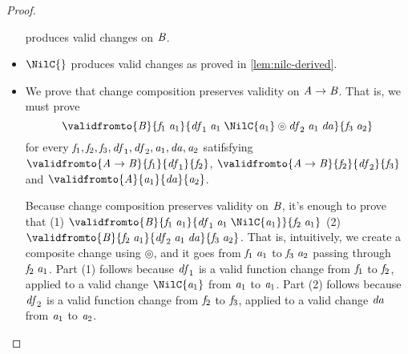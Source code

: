 \begin{proof}
\begin{itemize}
    produces valid changes on \ensuremath{\Conid{B}}.
  \item \ensuremath{\NilC{}} produces valid changes as proved in \cref{lem:nilc-derived}.
  \item We prove that change composition preserves validity on \ensuremath{\Conid{A}\to \Conid{B}}. That
    is, we must prove \[\ensuremath{\validfromto{\Conid{B}}{\Varid{f}_{1}\;\Varid{a}_{1}}{\Varid{df}_{1}\;\Varid{a}_{1}\;\NilC{\Varid{a}_{1}}\circledcirc\Varid{df}_{2}\;\Varid{a}_{1}\;\Varid{da}}{\Varid{f}_{3}\;\Varid{a}_{2}}}\] for every \ensuremath{\Varid{f}_{1},\Varid{f}_{2},\Varid{f}_{3},\Varid{df}_{1},\Varid{df}_{2},\Varid{a}_{1},\Varid{da},\Varid{a}_{2}} satifsfying
    \ensuremath{\validfromto{\Conid{A}\to \Conid{B}}{\Varid{f}_{1}}{\Varid{df}_{1}}{\Varid{f}_{2}}}, \ensuremath{\validfromto{\Conid{A}\to \Conid{B}}{\Varid{f}_{2}}{\Varid{df}_{2}}{\Varid{f}_{3}}} and \ensuremath{\validfromto{\Conid{A}}{\Varid{a}_{1}}{\Varid{da}}{\Varid{a}_{2}}}.

    Because change composition preserves validity on \ensuremath{\Conid{B}}, it's enough to prove
    that (1) \ensuremath{\validfromto{\Conid{B}}{\Varid{f}_{1}\;\Varid{a}_{1}}{\Varid{df}_{1}\;\Varid{a}_{1}\;\NilC{\Varid{a}_{1}}}{\Varid{f}_{2}\;\Varid{a}_{1}}} (2) \ensuremath{\validfromto{\Conid{B}}{\Varid{f}_{2}\;\Varid{a}_{1}}{\Varid{df}_{2}\;\Varid{a}_{1}\;\Varid{da}}{\Varid{f}_{3}\;\Varid{a}_{2}}}. That is, intuitively, we create a composite change
    using \ensuremath{\circledcirc }, and it goes from \ensuremath{\Varid{f}_{1}\;\Varid{a}_{1}} to \ensuremath{\Varid{f}_{3}\;\Varid{a}_{2}} passing through \ensuremath{\Varid{f}_{2}\;\Varid{a}_{1}}. Part (1) follows because \ensuremath{\Varid{df}_{1}} is a valid function change from \ensuremath{\Varid{f}_{1}} to
    \ensuremath{\Varid{f}_{2}}, applied to a valid change \ensuremath{\NilC{\Varid{a}_{1}}} from \ensuremath{\Varid{a}_{1}} to \ensuremath{\Varid{a}_{1}}.\pg{} Part (2)
    follows because \ensuremath{\Varid{df}_{2}} is a valid function change from \ensuremath{\Varid{f}_{2}} to \ensuremath{\Varid{f}_{3}}, applied
    to a valid change \ensuremath{\Varid{da}} from \ensuremath{\Varid{a}_{1}} to \ensuremath{\Varid{a}_{2}}.
  \end{itemize}
\end{proof}

